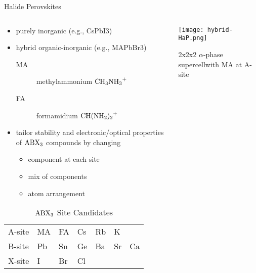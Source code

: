 \documentclass[10pt, aspectratio=169, presentation]{beamer}
\begin{document}
\begin{frame}[label={sec:org25984b2}]{Halide Perovskites}
\begin{columns}
\begin{column}{0.6\columnwidth}
\begin{itemize}
\item purely inorganic (e.g., CsPbI3)
\item hybrid organic-inorganic (e.g., MAPbBr3)
\begin{description}
\item[{MA}] methylammonium \(\ce{CH3NH3+}\)
\item[{FA}] formamidium \(\ce{CH(NH2)2+}\)
\end{description}
\item tailor stability and electronic/optical properties of \(\ce{ABX3}\)
compounds by changing
\begin{itemize}
\item component at each site
\item mix of components
\item atom arrangement
\end{itemize}
\end{itemize}

\begin{table}[htbp]
\caption{\(\ce{ABX3}\) Site Candidates}
\centering
\begin{tabular}{l|llllll}
A-site & MA & FA & Cs & Rb & K & \\[0pt]
B-site & Pb & Sn & Ge & Ba & Sr & Ca\\[0pt]
X-site & I & Br & Cl &  &  & \\[0pt]
\end{tabular}
\end{table}
\end{column}

\begin{column}{0.4\columnwidth}
\begin{center}
\texttt{[image: hybrid-HaP.png]}
\end{center}

\center{}2x2x2 \(\alpha\)-phase supercell\break \alert{with MA at A-site}
\end{column}
\end{columns}
\end{frame}
\end{document}
